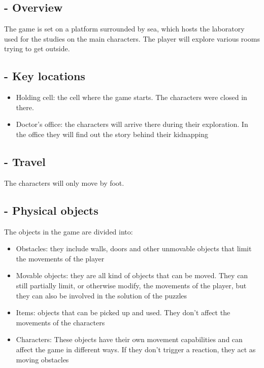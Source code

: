 \subsection{- Overview}
The game is set on a platform surrounded by sea, which hosts the laboratory used for the studies 
on the main characters. The player will explore various rooms trying to get outside.
\subsection{- Key locations}
\begin {itemize}
	\item Holding cell: the cell where the game starts. The characters were closed in there.
	\item Doctor's office: the characters will arrive there during their exploration. In the office they will find out the story behind their kidnapping
\end {itemize}
\subsection{- Travel}
The characters will only move by foot.
\subsection{- Physical objects}
The objects in the game are divided into:
\begin {itemize}
	\item Obstacles: they include walls, doors and other unmovable objects that limit the movements of the player
	\item Movable objects: they are all kind of objects that can be moved. They can still partially limit, or otherwise modify, the movements of the player, but they can also be involved in the solution of the puzzles
	\item Items: objects that can be picked up and used. They don't affect the movements of the characters
	\item Characters: These objects have their own movement capabilities and can affect the game in different ways. If they don't trigger a reaction, they act as moving obstacles
\end {itemize}

